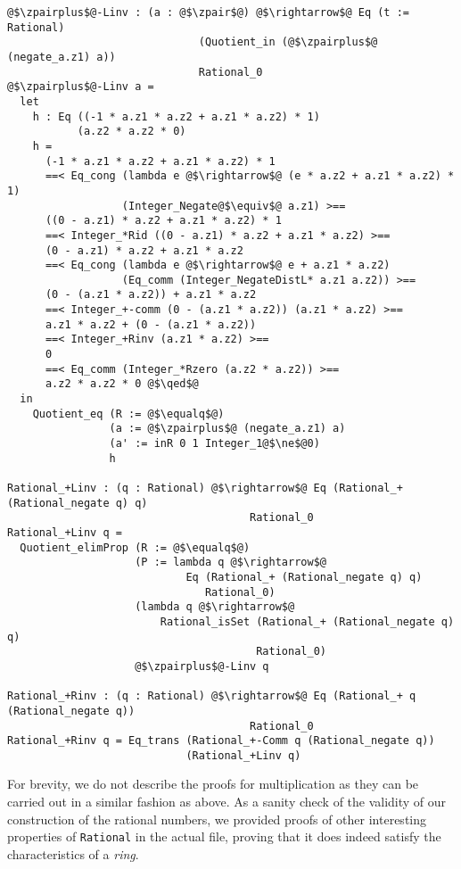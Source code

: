 \documentclass[12pt,twoside,maitrise]{dms}
\theoremstyle{definition}
\numberwithin{equation}{section}
\numberwithin{table}{chapter}
\numberwithin{figure}{chapter}
\newcommand\id[1] {\texttt{#1}}
\renewcommand\qed{\blacksquare}
\begin{document}
\begin{verbatim}
@$\zpairplus$@-Linv : (a : @$\zpair$@) @$\rightarrow$@ Eq (t := Rational)
                              (Quotient_in (@$\zpairplus$@ (negate_a.z1) a))
                              Rational_0
@$\zpairplus$@-Linv a =
  let
    h : Eq ((-1 * a.z1 * a.z2 + a.z1 * a.z2) * 1)
           (a.z2 * a.z2 * 0)
    h =
      (-1 * a.z1 * a.z2 + a.z1 * a.z2) * 1
      ==< Eq_cong (lambda e @$\rightarrow$@ (e * a.z2 + a.z1 * a.z2) * 1)
                  (Integer_Negate@$\equiv$@ a.z1) >==
      ((0 - a.z1) * a.z2 + a.z1 * a.z2) * 1
      ==< Integer_*Rid ((0 - a.z1) * a.z2 + a.z1 * a.z2) >==
      (0 - a.z1) * a.z2 + a.z1 * a.z2
      ==< Eq_cong (lambda e @$\rightarrow$@ e + a.z1 * a.z2)
                  (Eq_comm (Integer_NegateDistL* a.z1 a.z2)) >==
      (0 - (a.z1 * a.z2)) + a.z1 * a.z2
      ==< Integer_+-comm (0 - (a.z1 * a.z2)) (a.z1 * a.z2) >==
      a.z1 * a.z2 + (0 - (a.z1 * a.z2))
      ==< Integer_+Rinv (a.z1 * a.z2) >==
      0
      ==< Eq_comm (Integer_*Rzero (a.z2 * a.z2)) >==
      a.z2 * a.z2 * 0 @$\qed$@
  in
    Quotient_eq (R := @$\equalq$@)
                (a := @$\zpairplus$@ (negate_a.z1) a)
                (a' := inR 0 1 Integer_1@$\ne$@0)
                h

Rational_+Linv : (q : Rational) @$\rightarrow$@ Eq (Rational_+ (Rational_negate q) q)
                                      Rational_0
Rational_+Linv q =
  Quotient_elimProp (R := @$\equalq$@)
                    (P := lambda q @$\rightarrow$@
                            Eq (Rational_+ (Rational_negate q) q)
                               Rational_0)
                    (lambda q @$\rightarrow$@
                        Rational_isSet (Rational_+ (Rational_negate q) q)
                                       Rational_0)
                    @$\zpairplus$@-Linv q

Rational_+Rinv : (q : Rational) @$\rightarrow$@ Eq (Rational_+ q (Rational_negate q))
                                      Rational_0
Rational_+Rinv q = Eq_trans (Rational_+-Comm q (Rational_negate q))
                            (Rational_+Linv q)

\end{verbatim}

For brevity, we do not describe the proofs for multiplication as they can be
carried out in a similar fashion as above. As a sanity check of the validity of
our construction of the rational numbers, we provided proofs of other
interesting properties of \id{Rational} in the actual file, proving that it does
indeed satisfy the characteristics of a \emph{ring}.
\end{document}
